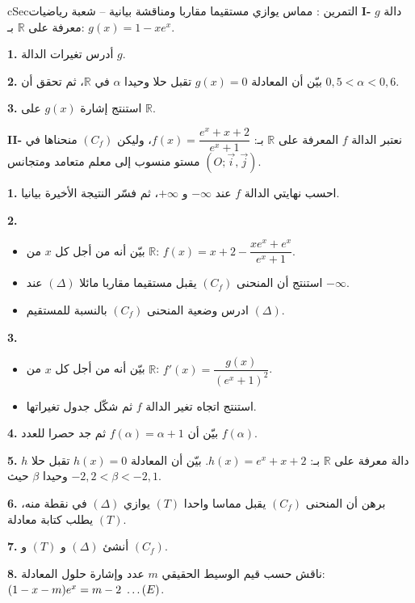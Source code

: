 \documentclass[12pt,a4paper]{article}
\newenvironment{BOX}[2]{\begin{otherlanguage}{english}\begin{arbox}{#1}{#2}}{\end{arbox}\end{otherlanguage}}
\newcounter{exo}
\newenvironment{tamrin}[1]{\stepcounter{exo}\begin{BOX}{cSec}{التمرين \theexo: #1}}{\end{BOX}}
\renewcommand{\ldots}{\mathinner{\ldotp\ldotp\ldotp}}
\newcommand{\R}{\mathbb{R}}
\newenvironment{sq}{\begin{itemize}[leftmargin=2.4em,itemsep=3pt]}{\end{itemize}}
\newcommand{\qa}{\item[(أ)]}\newcommand{\qb}{\item[(ب)]}\newcommand{\qc}{\item[(جـ)]}\newcommand{\qd}{\item[(د)]}\newcommand{\qe}{\item[(هـ)]}
\newcommand{\QQ}[1]{\par\smallskip\textbf{#1.} }
\begin{document}
\begin{tamrin}{مماس يوازي مستقيما مقاربا ومناقشة بيانية -- شعبة رياضيات}
\textbf{I-} $g$ دالة معرفة على $\R$ بـ: $g(x)=1-xe^{x}$.
\QQ{1} أدرس تغيرات الدالة $g$.
\QQ{2} بيّن أن المعادلة $g(x)=0$ تقبل حلا وحيدا $\alpha$ في $\R$، ثم تحقق أن $0{,}5<\alpha<0{,}6$.
\QQ{3} استنتج إشارة $g(x)$ على $\R$.

\textbf{II-} نعتبر الدالة $f$ المعرفة على $\R$ بـ: $f(x)=\dfrac{e^{x}+x+2}{e^{x}+1}$، وليكن $(C_f)$ منحناها في مستو منسوب إلى معلم متعامد ومتجانس $\left(O;\vec i,\vec j\right)$.
\QQ{1} احسب نهايتي الدالة $f$ عند $-\infty$ و $+\infty$، ثم فسّر النتيجة الأخيرة بيانيا.
\QQ{2} \begin{sq}
\qa بيّن أنه من أجل كل $x$ من $\R$: $f(x)=x+2-\dfrac{xe^{x}+e^{x}}{e^{x}+1}$.
\qb استنتج أن المنحنى $(C_f)$ يقبل مستقيما مقاربا مائلا $(\Delta)$ عند $-\infty$.
\qc ادرس وضعية المنحنى $(C_f)$ بالنسبة للمستقيم $(\Delta)$.
\end{sq}
\QQ{3} \begin{sq}
\qa بيّن أنه من أجل كل $x$ من $\R$: $f'(x)=\dfrac{g(x)}{\left(e^{x}+1\right)^{2}}$.
\qb استنتج اتجاه تغير الدالة $f$ ثم شكّل جدول تغيراتها.
\end{sq}
\QQ{4} بيّن أن $f(\alpha)=\alpha+1$ ثم جد حصرا للعدد $f(\alpha)$.
\QQ{5} $h$ دالة معرفة على $\R$ بـ: $h(x)=e^{x}+x+2$. بيّن أن المعادلة $h(x)=0$ تقبل حلا وحيدا $\beta$ حيث $-2{,}2<\beta<-2{,}1$.
\QQ{6} برهن أن المنحنى $(C_f)$ يقبل مماسا واحدا $(T)$ يوازي $(\Delta)$ في نقطة منه، يطلب كتابة معادلة $(T)$.
\QQ{7} أنشئ $(\Delta)$ و $(T)$ و $(C_f)$.
\QQ{8} ناقش حسب قيم الوسيط الحقيقي $m$ عدد وإشارة حلول المعادلة: $(1-x-m)e^{x}=m-2\ \ldots(E)$.
\end{tamrin}
\end{document}
